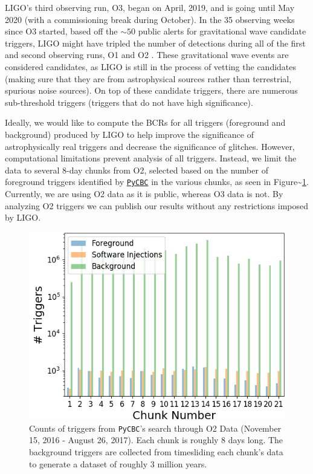 \documentclass[%
 reprint,
 amsmath,amssymb,
 aps,
]{revtex4}
\begin{document}
LIGO's third observing run, O3, began on April, 2019, and is going until May 2020 (with a commissioning break during
October). In the 35 observing weeks since O3 started, based off the \(\sim50\) public alerts for gravitational wave
candidate triggers, LIGO might have tripled the number of detections during all of the first and second observing runs,
O1 and O2 \citep{gracedb}. These gravitational wave events are considered candidates, as LIGO is still in the process of vetting the
candidates (making sure that they are from astrophysical sources rather than terrestrial, spurious noise sources). On
top of these candidate triggers, there are numerous sub-threshold triggers (triggers that do not have high
significance).

Ideally, we would like to compute the BCRs for all triggers (foreground and background) produced by LIGO to help improve
the significance of astrophysically real triggers and decrease the significance of glitches. However, computational
limitations prevent analysis of all triggers. Instead, we limit the data to several 8-day chunks from O2, selected based
on the number of foreground triggers identified by \href{https://pycbc.org/}{\texttt{PyCBC}} in the various chunks, as seen in
Figure\textasciitilde\ref{fig:o2TrigCount}. Currently, we are using O2 data as it is public, whereas O3 data is not. By analyzing O2
triggers we can publish our results without any restrictions imposed by LIGO.



\begin{figure}[!h]

{\centering \includegraphics[width=0.75\linewidth]{images/O2_unfiltered_trigger_counts} 

}

\caption[Count of all triggers in PyCBC O2 search]{Counts of triggers from \texttt{PyCBC}'s search through O2 Data (November 15, 2016 - August 26, 2017). Each chunk is roughly 8 days long. The background triggers are collected from timesliding each chunk's data to generate a dataset of roughly 3 million years.}\label{fig:o2TrigCount}
\end{figure}
\end{document}
